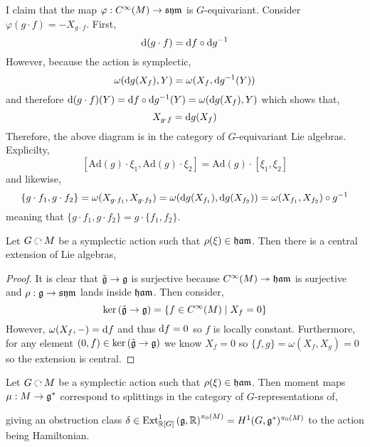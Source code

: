 \documentclass[12pt]{extarticle}
\newcommand{\R}{\mathbb{R}}
\newcommand{\Ad}{\mathrm{Ad}}
\begin{document}
\begin{rmk}
I claim that the map $\varphi : C^\infty(M) \to \mathfrak{sym}$ is $G$-equivariant. Consider $\varphi(g \cdot f) = - X_{g \cdot f}$. First,
\[ \mathrm{d}{(g \cdot f)} = \mathrm{d}{f} \circ \mathrm{d}{g^{-1}} \]
However, because the action is symplectic,
\[ \omega(\mathrm{d}{g}(X_f), Y) = \omega(X_f, \mathrm{d}{g^{-1}}(Y)) \]
and therefore $\mathrm{d}{(g \cdot f)}(Y) = \mathrm{d}{f} \circ \mathrm{d}{g^{-1}}(Y) = \omega(\mathrm{d}{g}(X_f), Y)$ which shows that,
\[ X_{g \cdot f} = \mathrm{d}{g}(X_f) \]
Therefore, the above diagram is in the category of $G$-equivariant Lie algebras. Explicilty,
\[ [\Ad(g) \cdot \xi_1, \Ad(g) \cdot \xi_2] = \Ad(g) \cdot [\xi_1, \xi_2] \]
and likewise,
\[ \{ g \cdot f_1, g \cdot f_2 \} = \omega(X_{g \cdot f_1}, X_{g \cdot f_2}) = \omega(\mathrm{d}{g}(X_{f_1}), \mathrm{d}{g}(X_{f_2})) = \omega(X_{f_1}, X_{f_2}) \circ g^{-1} \]
meaning that $\{ g \cdot f_1, g \cdot f_2 \} = g \cdot \{ f_1, f_2 \}$.
\end{rmk}

\begin{prop}
Let $G \acts M$ be a symplectic action such that $\rho(\xi) \in \mathfrak{ham}$. Then there is a central extension of Lie algebras,
\begin{center}
\end{center}
\end{prop}

\begin{proof}
It is clear that $\tilde{\mathfrak{g}} \to \mathfrak{g}$ is surjective because $C^\infty(M) \twoheadrightarrow \mathfrak{ham}$ is surjective and $\rho : \mathfrak{g} \to \mathfrak{sym}$ lands inside $\mathfrak{ham}$. Then consider,
\[ \ker{(\tilde{\mathfrak{g}} \to \mathfrak{g})} = \{ f \in C^\infty(M) \mid X_f = 0 \} \]
However, $\omega(X_f, -) = \mathrm{d}{f}$ and thus $\mathrm{d}{f} = 0$ so $f$ is locally constant. Furthermore, for any element $(0, f) \in \ker{(\tilde{\mathfrak{g}} \to \mathfrak{g})}$ we know $X_f = 0$ so $\{f, g \} = \omega(X_f, X_g) = 0$ so the extension is central.
\end{proof}

\begin{prop}
Let $G \acts M$ be a symplectic action such that $\rho(\xi) \in \mathfrak{ham}$. Then moment maps $\mu : M \to \mathfrak{g}^*$ correspond to splittings in the category of $G$-representations of,
\begin{center}
\end{center} 
giving an obstruction class $\delta \in \Ext{1}{\R[G]}{\g}{\R}^{\pi_0(M)} = H^1(G, \g^*)^{\pi_0(M)}$ to the action being Hamiltonian. 
\end{prop}
\end{document}
